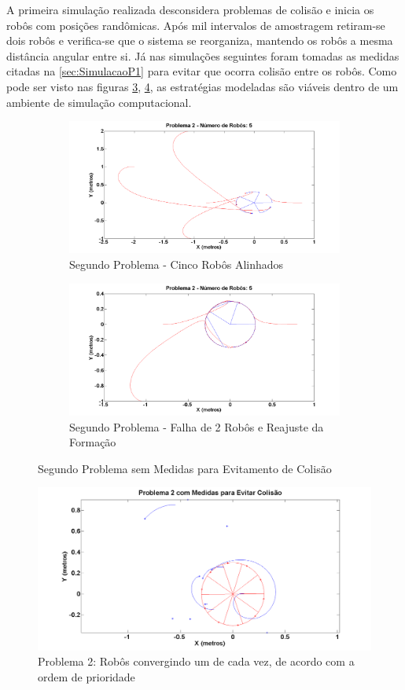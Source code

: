 A primeira simulação realizada desconsidera problemas de colisão e inicia os robôs com posições randômicas. Após mil intervalos de amostragem retiram-se dois robôs e verifica-se que o sistema se reorganiza, mantendo os robôs a mesma distância angular entre si. Já nas simulações seguintes foram tomadas as medidas citadas na \autoref{sec:SimulacaoP1} para evitar que ocorra colisão entre os robôs. Como pode ser visto nas figuras \ref{fig:sP2F}, \ref{fig:P2C}, as estratégias modeladas são viáveis dentro de um ambiente de simulação computacional.%

\begin{figure}[!htb]
	\centering
	\begin{subfigure}{1.0\textwidth}
		\centering
		\includegraphics[width=.9\linewidth]{./04-figuras/Simulacoes/Problema2/Falha/P2FalhaInicio}
		\caption{Segundo Problema - Cinco Robôs Alinhados}
		\label{fig:P2SF}
	\end{subfigure}
	\begin{subfigure}{1.0\textwidth}
		\centering
		\includegraphics[width=.9\linewidth]{./04-figuras/Simulacoes/Problema2/Falha/P2FalhaFim}
		\caption{Segundo Problema - Falha de 2 Robôs e Reajuste da Formação}
		\label{fig:P2SF2}
	\end{subfigure}
	\caption{Segundo Problema sem Medidas para Evitamento de Colisão}
	\label{fig:sP2F}
\end{figure}

\begin{figure}[!htb]
	\centering
	\includegraphics[width=.9\linewidth]{./04-figuras/Simulacoes/Problema2/Colisao/P2_C1}
	\caption{Problema 2: Robôs convergindo um de cada vez, de acordo com a ordem de prioridade}
	\label{fig:P2C}
\end{figure}

